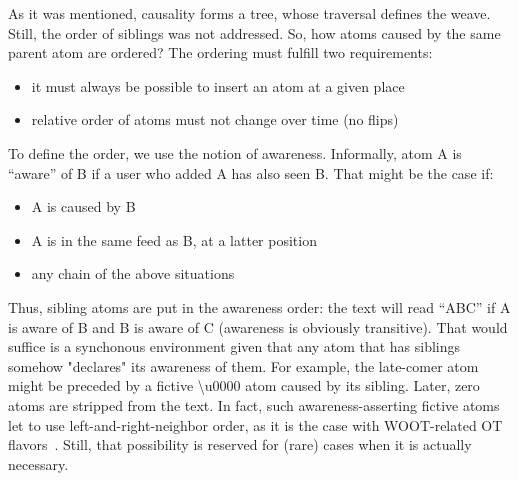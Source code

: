 \documentclass[twocolumn]{article}
\begin{document}
   As it was mentioned, causality forms a tree, whose traversal
   defines the weave. Still, the order of siblings was not addressed.
   So, how atoms caused by the same parent atom are ordered? The
   ordering must fulfill two requirements:
   \begin{itemize}
     \item it must always be possible to insert an atom at a given place
     \item relative order of atoms must not change over time (no flips)
   \end{itemize}
   To define the order, we use the notion of awareness. 
   Informally, atom A is ``aware'' of B if a user who added A has
   also seen B. That might be the case if:
   \begin{itemize}
     \item A is caused by B
     \item A is in the same feed as B, at a latter position
     \item any chain of the above situations
   \end{itemize}
   Thus,
   sibling atoms are put in the awareness order: the text will read
   ``ABC'' if A is aware of
   B and B is aware of C (awareness is obviously transitive). 
   That would suffice
   is a synchonous environment given that any atom that has siblings
   somehow "declares" its awareness of them. For example,
   the late-comer atom might be preceded by a fictive
   {\textbackslash}u0000 atom caused by its sibling.
   Later, zero atoms are stripped from the text.
   In fact, such awareness-asserting fictive atoms let to use
   left-and-right-neighbor order, as it is the case with WOOT-related
   OT flavors~\cite{woot}. Still, that possibility is reserved for
   (rare) cases when it is actually necessary.
   
\end{document}
